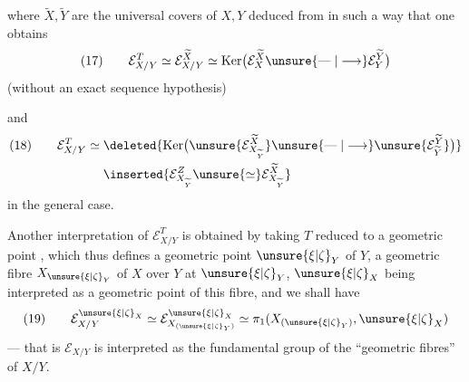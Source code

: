 
where $\widetilde X,\widetilde Y$ are the universal covers of $X,Y$ deduced from  in such a way that one obtains
\[
(17)\qquad \mathcal E_{X/Y}^T\simeq\mathcal E_{X/Y}^{\widetilde X}\simeq\operatorname{Ker}\bigl(\mathcal E_X^{\widetilde X}\unsure{\mathrel{\text{---}}|\longrightarrow}\mathcal E_Y^{\widetilde Y}\bigr)
\]
(without an exact sequence hypothesis)

and
\[
\begin{aligned}
(18)\qquad \mathcal E_{X/Y}^T\simeq{}&\deleted{\operatorname{Ker}\bigl(\unsure{\mathcal E_{X_{\widetilde Y}}^{\widetilde X}}\unsure{\mathrel{\text{---}}|\longrightarrow}\unsure{\mathcal E_{\widetilde Y}^{\widetilde Y}}\bigr)}\\
&\inserted{\mathcal E_{X_{\widetilde Y}}^Z\unsure{\simeq}\mathcal E_{X_{\widetilde Y}}^{\widetilde X}}
\end{aligned}
\]
in the general case.


Another interpretation of $\mathcal E_{X/Y}^T$ is obtained by taking $T$ reduced to a geometric point , which thus defines a geometric point $\unsure{\xi|\zeta}_Y$ of $Y$, a geometric fibre $X_{\unsure{\xi|\zeta}_Y}$ of $X$ over $Y$ at $\unsure{\xi|\zeta}_Y$, $\unsure{\xi|\zeta}_X$ being interpreted as a geometric point of this fibre, and we shall have
\[
(19)\qquad \mathcal E_{X/Y}^{\unsure{\xi|\zeta}_X}\simeq\mathcal E_{X_{(\unsure{\xi|\zeta}_Y)}}^{\unsure{\xi|\zeta}_X}\simeq\pi_1(X_{(\unsure{\xi|\zeta}_Y)},\unsure{\xi|\zeta}_X)
\]
--- that is $\mathcal E_{X/Y}$ is interpreted as the fundamental group of the ``geometric fibres'' of $X/Y$.

